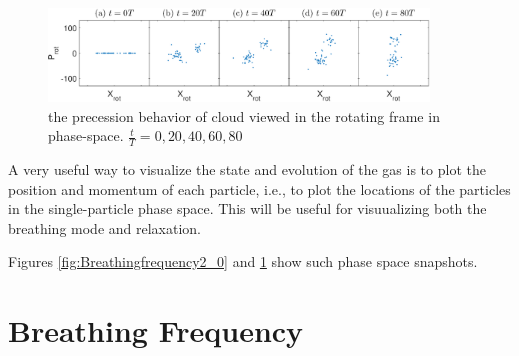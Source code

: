 \documentclass[aps,preprintnumbers,onecolumn,amsmath,amssymb,floatfix,pra]{revtex4-1}
\begin{document}
\begin{figure}
\includegraphics[width=0.9\textwidth]{ZhiyuPictures/rotating_frame_t=0-80T.eps}  
\caption{the precession behavior of cloud viewed in the rotating frame in phase-space. $\frac{t}{T}=0,20,40,60,80$}
\label{fig:Breathingfrequency2_1}
\end{figure}

A very useful way to visualize the state and evolution of the gas is to plot the position and
momentum of each particle, i.e., to plot the locations of the particles in the single-particle phase
space.  This will be useful for visuualizing both the breathing mode and relaxation.

Figures \ref{fig:Breathingfrequency2_0} and \ref{fig:Breathingfrequency2_1} show such phase space
snapshots. 



\section{Breathing Frequency}\label{section:breathing frequency}
\end{document}

